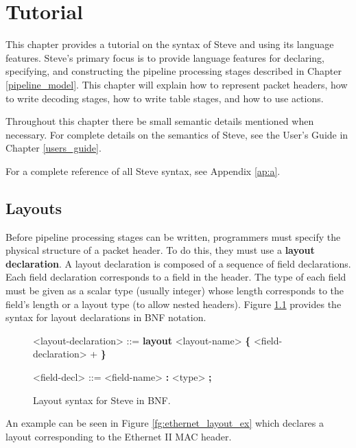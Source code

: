 \chapter{Tutorial} \label{tutorial}

This chapter provides a tutorial on the syntax of Steve and using its language features. Steve's primary focus is to provide language features for declaring, specifying, and constructing the pipeline processing stages described in Chapter \ref{pipeline_model}. This chapter will explain how to represent packet headers, how to write decoding stages, how to write table stages, and how to use actions.

Throughout this chapter there be small semantic details mentioned when necessary. For complete details on the semantics of Steve, see the User's Guide in Chapter \ref{users_guide}.

For a complete reference of all Steve syntax, see Appendix \ref{ap:a}.

\section{Layouts} \label{layout_tut}

Before pipeline processing stages can be written, programmers must specify the physical structure of a packet header. To do this, they must use a \textbf{layout declaration}. A layout declaration is composed of a sequence of field declarations. Each field declaration corresponds to a field in the header. The type of each field must be given as a scalar type (usually integer) whose length corresponds to the field's length or a layout type (to allow nested headers). Figure \ref{fg:layout_syntax} provides the syntax for layout declarations in BNF notation.

\begin{figure}
\begin{mdframed}
\begin{grammar}

<layout-declaration> ::=
\textbf{layout} <layout-name> 
\textbf{\{}
	<field-declaration> +
\textbf{\}}

<field-decl> ::=
<field-name> \textbf{:} <type> \textbf{;}

\end{grammar}
\end{mdframed}
\caption{Layout syntax for Steve in BNF.}
\label{fg:layout_syntax}
\end{figure}


An example can be seen in Figure \ref{fg:ethernet_layout_ex} which declares a layout corresponding to the Ethernet II MAC header. 

